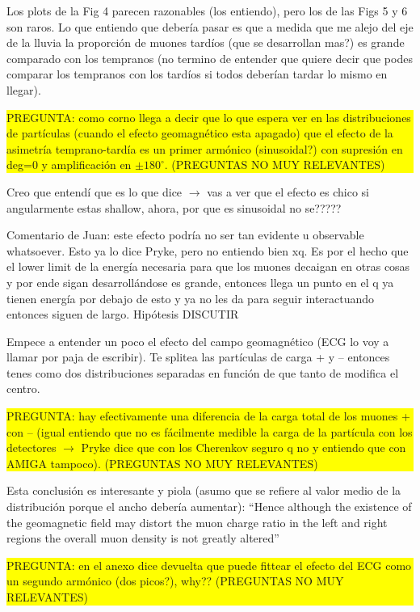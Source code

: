 Los plots de la Fig 4 parecen razonables (los entiendo), pero los de las Figs 5 y 6 son raros. Lo que entiendo que debería pasar es que a medida que me alejo del eje de la lluvia la proporción de muones tardíos (que se desarrollan mas?) es grande comparado con los tempranos (no termino de entender que quiere decir que podes comparar los tempranos con los tardíos si todos deberían tardar lo mismo en llegar). 

\colorbox{yellow}{
  \parbox{\dimexpr\textwidth-2\fboxsep}{%
  PREGUNTA: como corno llega a decir que lo que espera ver en las distribuciones de partículas (cuando el efecto geomagnético esta apagado) que el efecto de la asimetría temprano-tardía es un primer armónico (sinusoidal?) con supresión en deg=0 y amplificación en $\pm 180^\circ$. (PREGUNTAS NO MUY RELEVANTES)}}

Creo que entendí que es lo que dice $\rightarrow$ vas a ver que el efecto es chico si angularmente estas shallow, ahora, por que es sinusoidal no se?????

Comentario de Juan: este efecto podría no ser tan evidente u observable whatsoever. Esto ya lo dice Pryke, pero no entiendo bien xq. Es por el hecho que el lower limit de la energía necesaria para que los muones decaigan en otras cosas y por ende sigan desarrollándose es grande, entonces llega un punto en el q ya tienen energía por debajo de esto y ya no les da para seguir interactuando entonces siguen de largo. Hipótesis DISCUTIR

Empece a entender un poco el efecto del campo geomagnético (ECG lo voy a llamar por paja de escribir). Te splitea las partículas de carga + y – entonces tenes como dos distribuciones separadas en función de que tanto de modifica el centro.

\colorbox{yellow}{
  \parbox{\dimexpr\textwidth-2\fboxsep}{%
  PREGUNTA: hay efectivamente una diferencia de la carga total de los muones + con – (igual entiendo que no es fácilmente medible la carga de la partícula con los detectores $\rightarrow$ Pryke dice que con los Cherenkov seguro q no y entiendo que con AMIGA tampoco). (PREGUNTAS NO MUY RELEVANTES)}}

Esta conclusión es interesante y piola (asumo que se refiere al valor medio de la distribución porque el ancho debería aumentar): “Hence although the existence of the geomagnetic field may distort the muon charge ratio in the left and right regions the overall muon density is not greatly altered”

\colorbox{yellow}{
  \parbox{\dimexpr\textwidth-2\fboxsep}{%
    PREGUNTA: en el anexo dice devuelta que puede fittear el efecto del ECG como un segundo armónico (dos picos?), why?? (PREGUNTAS NO MUY RELEVANTES)}}


